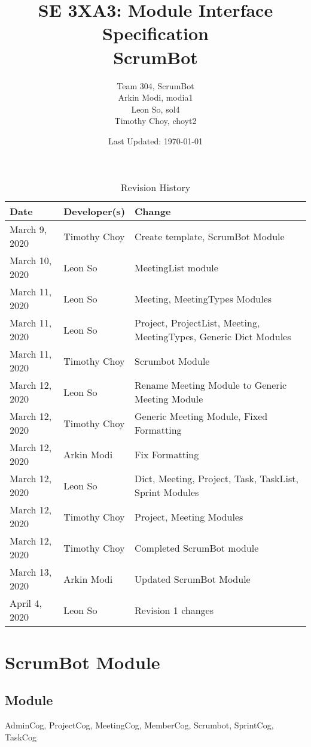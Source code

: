 \documentclass[12pt, titlepage]{article}
\title{SE 3XA3: Module Interface Specification\\ScrumBot}
\author{
    Team 304, ScrumBot
        \\ Arkin Modi, modia1
        \\ Leon So, sol4
        \\ Timothy Choy, choyt2
}
\date{Last Updated: \today}
\begin{document}
\maketitle

\begin{table}[H]
    \caption{Revision History} \label{TblRevisionHistory}
    \begin{tabularx}{\textwidth}{llX}
        \toprule
            \textbf{Date} & \textbf{Developer(s)} & \textbf{Change}\\
        \midrule
            March 9, 2020 & Timothy Choy & Create template, ScrumBot Module\\
            March 10, 2020 & Leon So & MeetingList module\\
            March 11, 2020 & Leon So & Meeting, MeetingTypes Modules\\
            March 11, 2020 & Leon So & Project, ProjectList, Meeting, MeetingTypes, Generic Dict Modules\\
            March 11, 2020 & Timothy Choy & Scrumbot Module\\
            March 12, 2020 & Leon So & Rename Meeting Module to Generic Meeting Module\\
            March 12, 2020 & Timothy Choy & Generic Meeting Module, Fixed Formatting\\
            March 12, 2020 & Arkin Modi & Fix Formatting\\
            March 12, 2020 & Leon So & Dict, Meeting, Project, Task, TaskList, Sprint Modules\\
            March 12, 2020 & Timothy Choy & Project, Meeting Modules\\
            March 12, 2020 & Timothy Choy & Completed ScrumBot module\\
            March 13, 2020 & Arkin Modi & Updated ScrumBot Module\\
            April 4, 2020 & Leon So & Revision 1 changes\\
        \bottomrule
    \end{tabularx}
\end{table}

\newpage
\section* {ScrumBot Module}

\subsection*{Module}
AdminCog, ProjectCog, MeetingCog, MemberCog, Scrumbot, SprintCog, TaskCog
\end{document}
